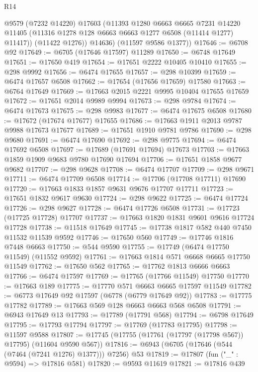 \begin{lexlean}{R14}
\begin{coremodule}
{{{{{{{{{{{{{{{{{{{{{{{{{{{{{{{{{{{{{{{{{{{{{{{{{{{{{{{{{{{{{{{{{{{{{{{{{{{{{{{{{{          @9579
          (@7232 @14220)
          @17603
          (@11393
            @1280
            @6663
            @6665
            @7231
            @14220
            @11405
            (@11316 @1278 @128 @6663 @6663 @1277 @6508 (@11414 @1277) @11417))
          (@11422 @1276))
        @14636)
      (@11597 @9586 @1377))
@17646 := @6708 @92
@17649 := @6705 (@17646 @17597) @11289
@17650 := @6748 @17649
@17651 := @17650 @419
@17654 := @17651 @2222 @10405 @10410
@17655 := @298 @9992
@17656 := @6474 @17655
@17657 := @298 @10399
@17659 := @6474 @17657 @6508
@17662 := @17654 (@17656 @17659) @17580
@17663 := @6764 @17649
@17669 := @17663 @2015 @2221 @9995 @10404 @17655 @17659
@17672 := @17651 @2014 @9989 @9994
@17673 := @298 @9784
@17674 := @6474 @17673
@17675 := @298 @9983
@17677 := @6474 @17675 @6508
@17680 := @17672 (@17674 @17677) @17655
@17686 := @17663 @1911 @2013 @9787 @9988 @17673 @17677
@17689 := @17651 @1910 @9781 @9786
@17690 := @298 @9680
@17691 := @6474 @17690
@17692 := @298 @9775
@17694 := @6474 @17692 @6508
@17697 := @17689 (@17691 @17694) @17673
@17703 := @17663 @1859 @1909 @9683 @9780 @17690 @17694
@17706 := @17651 @1858 @9677 @9682
@17707 := @298 @9628
@17708 := @6474 @17707
@17709 := @298 @9671
@17711 := @6474 @17709 @6508
@17714 := @17706 (@17708 @17711) @17690
@17720 := @17663 @1833 @1857 @9631 @9676 @17707 @17711
@17723 := @17651 @1832 @9617 @9630
@17724 := @298 @9622
@17725 := @6474 @17724
@17726 := @298 @9627
@17728 := @6474 @17726 @6508
@17731 := @17723 (@17725 @17728) @17707
@17737 := @17663 @1820 @1831 @9601 @9616 @17724 @17728
@17738 := @11518 @17649
@17745 := @17738 @1817 @582 @440 @7450 @11532 @11539 @9592
@17746 := @17650 @560
@17749 := @17746 @1816 @7448 @6663
@17750 := @544 @9590
@17755 := @17749 (@6474 @17750 @11549) (@11552 @9592)
@17761 := @17663 @1814 @571 @6668 @6665 @17750 @11549
@17762 := @17650 @562
@17765 := @17762 @1813 @6666 @6663
@17766 := @6474 @17597
@17769 := @17765 (@17766 @11549) @17750
@17770 := @17663 @189
@17775 := @17770 @571 @6663 @6665 @17597 @11549
@17782 := @6773 @17649 @92 @17597 (@6778 (@6779 @17649 @92))
@17783 := @17775 @17782
@17789 := @17663 @569 @128 @6663 @6663 @568 @6508
@17791 := @6943 @17649 @13
@17793 := @17789 (@17791 @568)
@17794 := @6798 @17649
@17795 := @17793 @17794
@17797 := @17769 (@17783 @17795)
@17798 := @11597 @9588
@17807 := @17745 (@17755 (@17761 (@17797 (@17798 @567)) @17795) (@11604 @9590 @567))
@17816 := @6943 (@6705 (@17646 (@544 (@7464 (@7241 @1276) @1377))) @7256) @53
@17819 := @17807 (fun ("_" : @9594) => @17816 @581)
@17820 := @9593 @11619
@17821 := @17816 @439
}}}}}}}}}}}}}}}}}}}}}}}}}}}}}}}}}}}}}}}}}}}}}}}}}}}}}}}}}}}}}}}}}}}}}}}}}}}}}}}}}}
\end{coremodule}
\end{lexlean}
